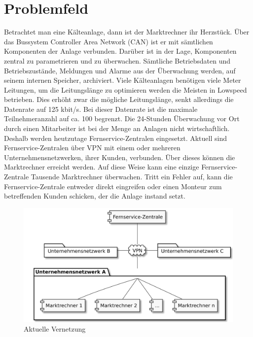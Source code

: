 \documentclass[11pt,a4paper]{report}
\begin{document}
\section{Problemfeld} \label{sec:problemfeld}

Betrachtet man eine Kälteanlage, dann ist der Marktrechner ihr Herzstück. Über das Bussystem Controller Area Network (CAN) ist er mit sämtlichen Komponenten der Anlage verbunden. Darüber ist in der Lage, Komponenten zentral zu parametrieren und zu überwachen. Sämtliche Betriebsdaten und Betriebszustände, Meldungen und Alarme aus der Überwachung werden, auf seinem internen Speicher, archiviert. Viele Kälteanlagen benötigen viele Meter Leitungen, um die Leitungslänge zu optimieren werden die Meisten in Lowspeed betrieben. Dies erhöht zwar die mögliche Leitungslänge, senkt allerdings die Datenrate auf 125 kbit/s. Bei dieser Datenrate ist die maximale Teilnehmeranzahl auf ca. 100 begrenzt. Die 24-Stunden Überwachung vor Ort durch einen Mitarbeiter ist bei der Menge an Anlagen nicht wirtschaftlich. Deshalb werden heutzutage Fernservice-Zentralen eingesetzt. Aktuell sind Fernservice-Zentralen über VPN mit einem oder mehreren Unternehmensnetzwerken, ihrer Kunden, verbunden. Über dieses können die Marktrechner erreicht werden. Auf diese Weise kann eine einzige Fernservice-Zentrale Tausende Marktrechner überwachen. Tritt ein Fehler auf, kann die Fernservice-Zentrale entweder direkt eingreifen oder einen Monteur zum betreffenden Kunden schicken, der die Anlage instand setzt.

\begin{figure}[h]
\centering
\includegraphics[scale=0.2]{images/problemfeld.pdf}
\caption{Aktuelle Vernetzung}
\label{fig:current_setup}
\end{figure}
\end{document}
